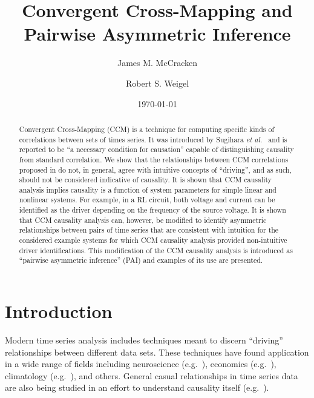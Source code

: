 \documentclass[twocolumn,aps,pre,groupedaddress]{revtex4-1}
\begin{document}
\title{Convergent Cross-Mapping and Pairwise Asymmetric Inference}
\author{James M. McCracken}
\author{Robert S. Weigel}
\date{\today}

\begin{abstract}
Convergent Cross-Mapping (CCM) is a technique for computing specific kinds of correlations between sets of times series.  It was introduced by Sugihara {\em et al.\ }\cite{Sugihara2012} and is reported to be ``a necessary condition for causation'' capable of distinguishing causality from standard correlation.  We show that the relationships between CCM correlations proposed in \cite{Sugihara2012} do not, in general, agree with intuitive concepts of ``driving'', and as such, should not be considered indicative of causality.  It is shown that CCM causality analysis implies causality is a function of system parameters for simple linear and nonlinear systems.  For example, in a RL circuit, both voltage and current can be identified as the driver depending on the frequency of the source voltage.  It is shown that CCM causality analysis can, however, be modified to identify asymmetric relationships between pairs of time series that are consistent with intuition for the considered example systems for which CCM causality analysis provided non-intuitive driver identifications.  This modification of the CCM causality analysis is introduced as ``pairwise asymmetric inference'' (PAI) and examples of its use are presented.  
\end{abstract}

\pacs{}
\maketitle

\section{Introduction}
Modern time series analysis includes techniques meant to discern ``driving'' relationships between different data sets.  These techniques have found application in a wide range of fields including neuroscience (e.g.\ \cite{Kaminski2001}), economics (e.g.\ \cite{dufour1998,dufour2006}), climatology (e.g.\ \cite{mosedale2006}), and others.  General casual relationships in time series data are also being studied in an effort to understand causality itself (e.g.\ \cite{eichler2012}).  
\end{document}

